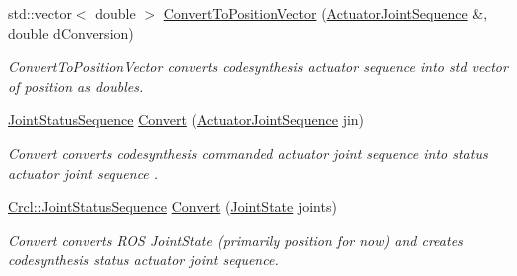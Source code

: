\begin{DoxyCompactItemize}
std\-::vector$<$ double $>$ \hyperlink{namespaceCrcl_af6bec848a13c03669ca8920795c5d3ad}{Convert\-To\-Position\-Vector} (\hyperlink{namespaceCrcl_af084766e8e2d38a135cc67ef54d9904d}{Actuator\-Joint\-Sequence} \&, double d\-Conversion)
\begin{DoxyCompactList}\small\item\em Convert\-To\-Position\-Vector converts codesynthesis actuator sequence into std vector of position as doubles. \end{DoxyCompactList}\item 
\hyperlink{namespaceCrcl_a8e2d423195eeffb85b45b63f595f2825}{Joint\-Status\-Sequence} \hyperlink{namespaceCrcl_a329b70844c080b1a81c89989b58ffbd5}{Convert} (\hyperlink{namespaceCrcl_af084766e8e2d38a135cc67ef54d9904d}{Actuator\-Joint\-Sequence} jin)
\begin{DoxyCompactList}\small\item\em Convert converts codesynthesis commanded actuator joint sequence into status actuator joint sequence . \end{DoxyCompactList}\item 
\hyperlink{namespaceCrcl_a8e2d423195eeffb85b45b63f595f2825}{Crcl\-::\-Joint\-Status\-Sequence} \hyperlink{namespaceCrcl_a1f43fba61abba477ee664c4b5c6dd65b}{Convert} (\hyperlink{RCS_8h_aa4adb93a26caa4dacba9c9614e283245}{Joint\-State} joints)
\begin{DoxyCompactList}\small\item\em Convert converts R\-O\-S Joint\-State (primarily position for now) and creates codesynthesis status actuator joint sequence. \end{DoxyCompactList}\end{DoxyCompactItemize}
